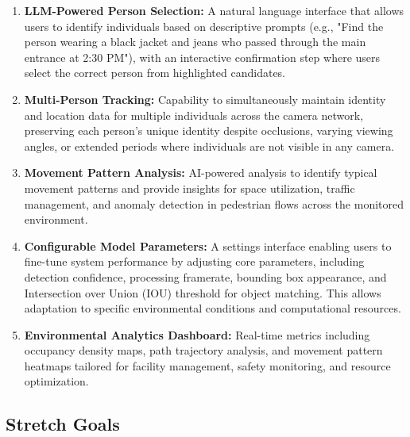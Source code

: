 \begin{enumerate}[leftmargin=80pt]
    \item \textbf{LLM-Powered Person Selection:} A natural language interface that allows users to identify individuals based on descriptive prompts (e.g., "Find the person wearing a black jacket and jeans who passed through the main entrance at 2:30 PM"), with an interactive confirmation step where users select the correct person from highlighted candidates.

    \item \textbf{Multi-Person Tracking:} Capability to simultaneously maintain identity and location data for multiple individuals across the camera network, preserving each person's unique identity despite occlusions, varying viewing angles, or extended periods where individuals are not visible in any camera.

    \item \textbf{Movement Pattern Analysis:} AI-powered analysis to identify typical movement patterns and provide insights for space utilization, traffic management, and anomaly detection in pedestrian flows across the monitored environment.

    \item \textbf{Configurable Model Parameters:}  A settings interface enabling users to fine-tune system performance by adjusting core parameters, including detection confidence, processing framerate, bounding box appearance, and Intersection over Union (IOU) threshold for object matching. This allows adaptation to specific environmental conditions and computational resources.
    
    \item \textbf{Environmental Analytics Dashboard:} Real-time metrics including occupancy density maps, path trajectory analysis, and movement pattern heatmaps tailored for facility management, safety monitoring, and resource optimization.
\end{enumerate}

\subsection{Stretch Goals}
\label{subsection:stretch-goals}

